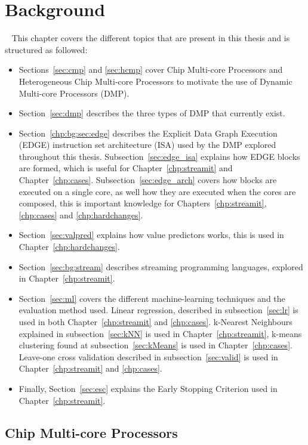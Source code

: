 \chapter{Background}~\label{chp:Background}
This chapter covers the different topics that are present in this thesis and is structured as followed:
\begin{itemize}
\item Sections~\ref{sec:cmp} and \ref{sec:hcmp} cover Chip Multi-core Processors and Heterogeneous Chip Multi-core Processors to motivate the use of Dynamic Multi-core Processors (DMP).
\item Section~\ref{sec:dmp}  describes the three types of DMP that currently exist.
\item Section~\ref{chp:bg:sec:edge} describes the Explicit Data Graph Execution (EDGE) instruction set architecture (ISA) used by the DMP explored throughout this thesis.
Subsection~\ref{sec:edge_isa} explains how EDGE blocks are formed, which is useful for Chapter~\ref{chp:streamit} and Chapter~\ref{chp:cases}.
Subsection~\ref{sec:edge_arch} covers how blocks are executed on a single core, as well how they are executed when the cores are composed, this is important knowledge for Chapters~\ref{chp:streamit}, \ref{chp:cases} and \ref{chp:hardchanges}.
\item Section~\ref{sec:valpred} explains how value predictors works, this is used in Chapter~\ref{chp:hardchanges}.
\item Section~\ref{sec:bg:stream} describes streaming programming languages, explored in Chapter~\ref{chp:streamit}.
\item Section~\ref{sec:ml} covers the different machine-learning techniques and the evaluation method used.
Linear regression, described in subsection~\ref{sec:lr} is used in both Chapter~\ref{chp:streamit} and \ref{chp:cases}.
k-Nearest Neighbours explained in subsection~\ref{sec:kNN} is used in Chapter~\ref{chp:streamit}, k-means clustering found at subsection~\ref{sec:kMeans} is used in Chapter~\ref{chp:cases}.
Leave-one cross validation described in subsection~\ref{sec:valid} is used in Chapter~\ref{chp:streamit} and \ref{chp:cases}.
\item Finally, Section~\ref{sec:esc} explains the Early Stopping Criterion used in Chapter~\ref{chp:streamit}.
\end{itemize}

\section{Chip Multi-core Processors}~\label{sec:cmp}

